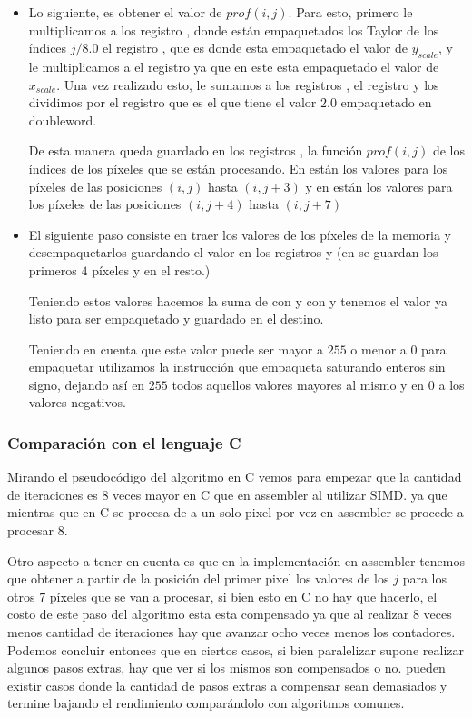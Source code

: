 \begin{itemize}
  \item Lo siguiente, es obtener el valor de $prof(i,j)$. Para esto, primero le multiplicamos a los registro ,  donde están empaquetados los Taylor de los índices $j/8.0$ el registro , que es donde esta empaquetado el valor de $y_{scale}$, y le multiplicamos  a  el registro  ya que en este esta empaquetado el valor de $x_{scale}$. Una vez realizado esto, le sumamos a los registros ,  el registro  y los dividimos por el registro  que es el que tiene el valor $2.0$ empaquetado en doubleword.

  De esta manera queda guardado en los registros ,  la función $prof(i,j)$ de los índices de los píxeles que se están procesando. En  están los valores para los píxeles de las posiciones $(i,j)$ hasta $(i,j+3)$ y en  están los valores para los píxeles de las posiciones $(i,j+4)$ hasta $(i,j+7)$

  \item El siguiente paso consiste en traer los valores de los píxeles de la memoria y desempaquetarlos guardando el valor en los registros  y  (en  se guardan los primeros $4$ píxeles y en  el resto.)

  Teniendo estos valores hacemos la suma de  con  y  con  y tenemos el valor ya listo para ser empaquetado y guardado en el destino.

  Teniendo en cuenta que este valor puede ser mayor a $255$ o menor a $0$ para empaquetar utilizamos la instrucción  que empaqueta saturando enteros sin signo, dejando así en $255$ todos aquellos valores mayores al mismo y en $0$ a los valores negativos.
\end{itemize}

\subsubsection{Comparación con el lenguaje C}

Mirando el pseudocódigo del algoritmo en C vemos para empezar que la cantidad de iteraciones es 8 veces mayor en C que en assembler al utilizar SIMD. ya que mientras que en C se procesa de a un solo pixel por vez en assembler se procede a procesar 8.

Otro aspecto a tener en cuenta es que en la implementación en assembler tenemos que obtener a partir de la posición del primer pixel los valores de los $j$ para los otros $7$ píxeles que se van a procesar, si bien esto en C no hay que hacerlo, el costo de este paso del algoritmo esta esta compensado ya que al realizar 8 veces menos cantidad de iteraciones hay que avanzar ocho veces menos los contadores. Podemos concluir entonces que en ciertos casos, si bien paralelizar supone realizar algunos pasos extras, hay que ver si los mismos son compensados o no. pueden existir casos donde la cantidad de pasos extras a compensar sean demasiados y termine bajando el rendimiento comparándolo con algoritmos comunes.

